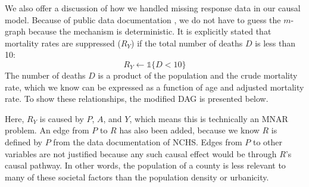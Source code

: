 \documentclass{article}
\theoremstyle{plain}
\theoremstyle{definition}
\theoremstyle{remark}
\begin{document}
We also offer a discussion of how we handled missing response data in our causal model. Because of public data documentation \citet{cdc_wonder_cmf_doc},
we do not have to guess the $m$-graph because
the mechanism is deterministic. It is explicitly
stated that mortality rates are suppressed ($R_Y$) if the total
number of deaths $D$ is less than 10:
$$R_Y \leftarrow \mathds{1} \{D < 10\}$$
The number of deaths
$D$ is a product of the population and the crude
mortality rate, which we know can be expressed as a function of age
and adjusted mortality rate. To show these relationships,
the modified DAG is presented below.

\centering
{}

\justifying

Here, $R_Y$ is caused by $P$, $A$, and $Y$, which means this is technically an MNAR problem. An edge from
$P$ to $R$ has also been added, because we know $R$ is defined by $P$ from the data documentation of NCHS.
Edges from $P$ to other variables are not justified because any such causal effect would be through $R$'s
causal pathway. In other words, the population of a county is less relevant to many of these societal factors than the population density or urbanicity.
\end{document}
